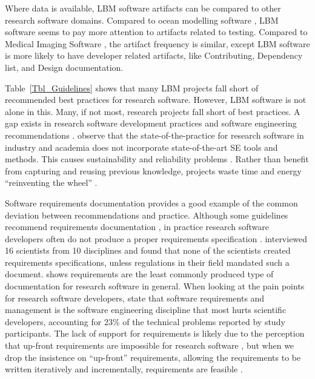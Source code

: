 \documentclass[final, 3p, times, authoryear]{elsarticle}
\begin{document}
Where data is available, LBM software artifacts can be compared to other
research software domains.  Compared to ocean modelling software
\citep{JungEtAl2022}, LBM software seems to pay more attention to artifacts
related to testing.  Compared to Medical Imaging Software \citep{Dong2021}, the
artifact frequency is similar, except LBM software is more likely to have
developer related artifacts, like Contributing, Dependency list, and Design
documentation.

Table~\ref{Tbl_Guidelines} shows that many LBM projects fall short of
recommended best practices for research software.  However, LBM software is not
alone in this.  Many, if not most, research projects fall short of best
practices.  A gap exists in research software development practices and software
engineering recommendations \citep{Storer2017, Kelly2007, OwojaiyeEtAl2021_CSE}.
\citet{JohansonAndHasselbring2018} observe that the state-of-the-practice for
research software in industry and academia does not incorporate state-of-the-art
SE tools and methods.  This causes sustainability and reliability problems
\citep{FaulkEtAl2009}. Rather than benefit from capturing and reusing previous
knowledge, projects waste time and energy ``reinventing the wheel''
\citep{deSouzaEtAl2019}. 

Software requirements documentation provides a good example of the common
deviation between recommendations and practice.  Although some guidelines
recommend requirements documentation \citep{TobiasEtAl2018, HerouxEtAl2008,
SmithAndKoothoor2016}, in practice research software developers often do not
produce a proper requirements specification \citep{HeatonAndCarver2015}.
\citet{SandersAndKelly2008} interviewed 16 scientists from 10 disciplines and
found that none of the scientists created requirements specifications, unless
regulations in their field mandated such a document. \citet{Nguyen-HoanEtAl2010}
shows requirements are the least commonly produced type of documentation for
research software in general. When looking at the pain points for research
software developers, \citet{WieseEtAl2019} state that software requirements and
management is the software engineering discipline that most hurts scientific
developers, accounting for 23\% of the technical problems reported by study
participants.  The lack of support for requirements is likely due to the
perception that up-front requirements are impossible for research software
\citep{CarverEtAl2007, SegalAndMorris2008}, but when we drop the insistence on
``up-front'' requirements, allowing the requirements to be written
iteratively and incrementally, requirements are feasible \citep{Smith2016}.
\end{document}
